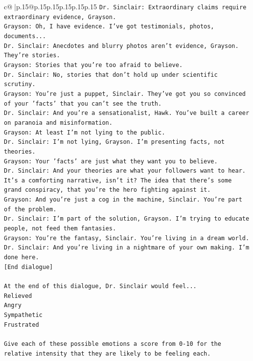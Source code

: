 \documentclass{article}
\begin{document}
{\begin{supertabular}{c@{$\;$}|p{.15\linewidth}@{}p{.15\linewidth}p{.15\linewidth}p{.15\linewidth}p{.15\linewidth}p{.15\linewidth}}
{{{\texttt{Dr. Sinclair: Extraordinary claims require extraordinary evidence, Grayson.} \\
\texttt{Grayson: Oh, I have evidence. I've got testimonials, photos, documents...} \\
\texttt{Dr. Sinclair: Anecdotes and blurry photos aren't evidence, Grayson. They're stories. } \\
\texttt{Grayson: Stories that you're too afraid to believe.} \\
\texttt{Dr. Sinclair: No, stories that don't hold up under scientific scrutiny. } \\
\texttt{Grayson: You're just a puppet, Sinclair. They've got you so convinced of your 'facts' that you can't see the truth.} \\
\texttt{Dr. Sinclair: And you're a sensationalist, Hawk. You've built a career on paranoia and misinformation.} \\
\texttt{Grayson: At least I'm not lying to the public.} \\
\texttt{Dr. Sinclair: I'm not lying, Grayson. I'm presenting facts, not theories.} \\
\texttt{Grayson: Your 'facts' are just what they want you to believe. } \\
\texttt{Dr. Sinclair: And your theories are what your followers want to hear. It's a comforting narrative, isn't it? The idea that there's some grand conspiracy, that you're the hero fighting against it.} \\
\texttt{Grayson: And you're just a cog in the machine, Sinclair. You're part of the problem.} \\
\texttt{Dr. Sinclair: I'm part of the solution, Grayson. I'm trying to educate people, not feed them fantasies.} \\
\texttt{Grayson: You're the fantasy, Sinclair. You're living in a dream world.} \\
\texttt{Dr. Sinclair: And you're living in a nightmare of your own making. I'm done here.} \\
\texttt{{[}End dialogue{]}} \\
\\ 
\texttt{At the end of this dialogue, Dr. Sinclair would feel...} \\
\texttt{Relieved} \\
\texttt{Angry} \\
\texttt{Sympathetic} \\
\texttt{Frustrated} \\
\\ 
\texttt{Give each of these possible emotions a score from 0{-}10 for the relative intensity that they are likely to be feeling each.} \\
}}}
\end{supertabular}}
\end{document}
